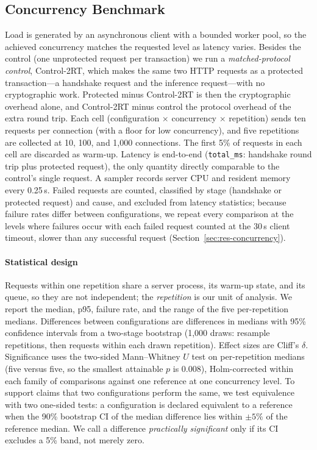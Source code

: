 \documentclass[conference]{IEEEtran}
\begin{document}
\subsection{Concurrency Benchmark}
Load is generated by an asynchronous client with a bounded worker pool, so the achieved concurrency
matches the requested level as latency varies. Besides the control (one unprotected request per
transaction) we run a \emph{matched-protocol control}, Control-2RT, which makes the same two HTTP
requests as a protected transaction---a handshake request and the inference request---with no
cryptographic work. Protected minus Control-2RT is then the cryptographic overhead alone, and
Control-2RT minus control the protocol overhead of the extra round trip. Each cell (configuration $\times$ concurrency
$\times$ repetition) sends ten requests per connection (with a floor for low concurrency), and five
repetitions are collected at 10, 100, and 1,000 connections. The first 5\% of requests in each cell
are discarded as warm-up. Latency is end-to-end (\texttt{total\_ms}: handshake round trip plus
protected request), the only quantity directly comparable to the control's single request. A sampler records server CPU and resident memory every 0.25\,s.
Failed requests are counted, classified by stage (handshake or protected request) and cause, and
excluded from latency statistics; because failure rates differ between configurations, we repeat
every comparison at the levels where failures occur with each failed request counted at the 30\,s
client timeout, slower than any successful request (Section~\ref{sec:res-concurrency}).

\paragraph*{Statistical design} Requests within one repetition share a server process, its warm-up
state, and its queue, so they are not independent; the \emph{repetition} is our unit of analysis. We
report the median, p95, failure rate, and the range of the five per-repetition medians. Differences
between configurations are differences in medians with 95\% confidence intervals from a two-stage
bootstrap (1,000 draws: resample repetitions, then requests within each drawn repetition). Effect
sizes are Cliff's $\delta$. Significance uses the two-sided Mann--Whitney $U$ test on per-repetition
medians (five versus five, so the smallest attainable $p$ is 0.008), Holm-corrected within each
family of comparisons against one reference at one concurrency level. To support claims that two configurations perform the same, we test
equivalence with two one-sided tests: a configuration is declared equivalent to a reference when
the 90\% bootstrap CI of the median difference lies within $\pm5\%$ of the reference median. We call
a difference \emph{practically significant} only if its CI excludes a 5\% band, not merely zero.
\end{document}
